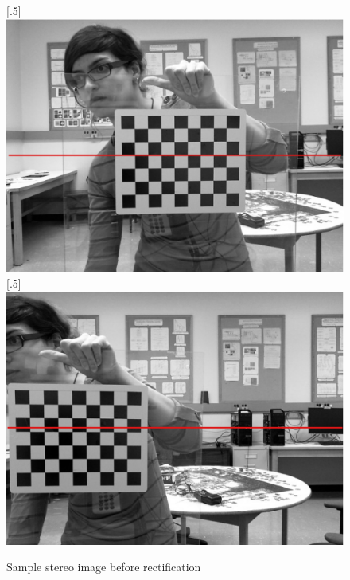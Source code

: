 \begin{figure}[h!]
\centering
{}
[.5\linewidth]{\includegraphics[scale=0.35]{RectL}}%
[.5\linewidth]{\includegraphics[scale=0.35]{RectR}}%
\caption{Sample stereo image before rectification}
\label{fig:unrect}
\end{figure}

